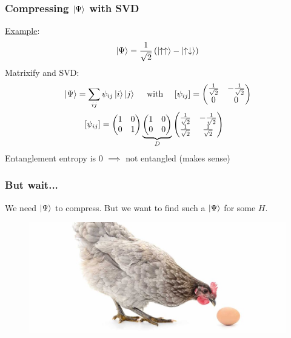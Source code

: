 \documentclass{beamer}
\theoremstyle{definition}
\newcommand{\lp}{\left(}
\newcommand{\rp}{\right)}
\newcommand{\f}[2]{\frac{#1}{#2}}
\begin{document}
\begin{frame}
	\frametitle{Compressing $\ket{\Psi}$ with SVD}
	
	\underline{Example}:  
	\begin{align*}
		\ket{\Psi} = \f{1}{\sqrt{2}}\lp \ket{\uparrow\uparrow} - \ket{\uparrow\downarrow} \rp
	\end{align*}
	Matrixify and SVD:
	\begin{align*}
		&\ket{\Psi} = \sum_{ij}\psi_{ij}\ket{i}\ket{j} \quad \text{ with } \quad   [\psi_{ij}] = \begin{pmatrix}
			\f{1}{\sqrt{2}} & -\f{1}{\sqrt{2}} \\ 0 & 0
		\end{pmatrix}\\
		&\quad\quad \,\,\,[\psi_{ij}] = \begin{pmatrix}
			1 & 0 \\ 0 & 1
		\end{pmatrix}
		\underbrace{\begin{pmatrix}
				1 & 0 \\ 0 & 0 
		\end{pmatrix}}_D
		\begin{pmatrix}
			\f{1}{\sqrt{2}} & -\f{1}{\sqrt{2}} \\ 	\f{1}{\sqrt{2}} & \f{1}{\sqrt{2}}
		\end{pmatrix}
	\end{align*}
	Entanglement entropy is 0 $\implies$ not entangled (makes sense)
\end{frame}



\begin{frame}
	\frametitle{But wait...}
		
	We need $\ket{\Psi}$ to compress. But we want to find such a $\ket{\Psi}$ for some $H$. \\
	
	\vspace{15pt}
	
	\begin{figure}[!htb]
		\centering
		\includegraphics[scale=0.2]{chickenegg.jpg}
	\end{figure}
	
	\vspace{8pt}

\end{frame}
\end{document}
